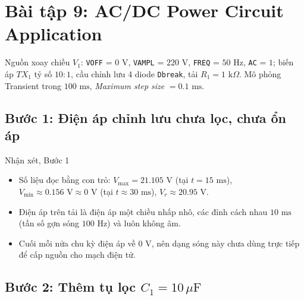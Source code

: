 \section{Bài tập 9: AC/DC Power Circuit Application}

Nguồn xoay chiều $V_1$: \texttt{VOFF} = $0\text{ V}$, \texttt{VAMPL} = $220\text{ V}$, \texttt{FREQ} = $50\text{ Hz}$, \texttt{AC} = $1$; biến áp $TX_1$ tỷ số $10:1$, cầu chỉnh lưu 4 diode \texttt{Dbreak}, tải $R_1 = 1\text{ k}\Omega$. Mô phỏng Transient trong $100\text{ ms}$, \textit{Maximum step size} $= 0.1\text{ ms}$.

\Needspace{0.4\textheight}
\subsection{Bước 1: Điện áp chỉnh lưu chưa lọc, chưa ổn áp}

\simresult
{}

\begin{notebox}{Nhận xét, Bước 1}
  \begin{itemize}[leftmargin=1.5em,itemsep=2pt,topsep=2pt]
    \item Số liệu đọc bằng con trỏ: $V_{\max} = 21.105\text{ V}$ (tại $t = 15\text{ ms}$), $V_{\min} \approx 0.156\text{ V} \approx 0\text{ V}$ (tại $t \approx 30\text{ ms}$), $V_r \approx 20.95\text{ V}$.
    \item Điện áp trên tải là điện áp một chiều nhấp nhô, các đỉnh cách nhau $10\text{ ms}$ (tần số gợn sóng $100\text{ Hz}$) và luôn không âm.
    \item Cuối mỗi nửa chu kỳ điện áp về $0\text{ V}$, nên dạng sóng này chưa dùng trực tiếp để cấp nguồn cho mạch điện tử.
  \end{itemize}
\end{notebox}

\Needspace{0.4\textheight}
\subsection{Bước 2: Thêm tụ lọc \texorpdfstring{$C_1 = 10\,\mu\text{F}$}{C1 = 10uF}}

\simresult
{}

